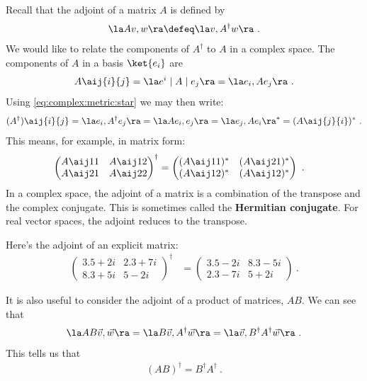 Recall that the adjoint of a matrix $A$ is defined by
\begin{align}
    \la A v , w \ra \defeq 
    \la v, A^\dag w \ra \ .
\end{align}
We would like to relate the components of $A^\dag$ to $A$ in a complex space. The components of $A$ in a basis $\ket{e_i}$ are 
\begin{align}
    A\aij{i}{j} = \la e^i \mid A \mid e_j \ra 
    = \la e_i, A e_j \ra \ .
\end{align}
Using \eqref{eq:complex:metric:star} we may then write:
\begin{align}
    (A^\dag)\aij{i}{j}
    = 
    \la e_i, A^\dag e_j \ra
    =
    \la A e_i, e_j \ra
    =
    \la e_j, A e_i \ra^*
    =
    (A\aij{j}{i})^* \ .
\end{align}
This means, for example, in matrix form:
\begin{align}
    \begin{pmatrix}
        A\aij 11 & A\aij 12 \\
        A\aij 21 & A\aij 22 
    \end{pmatrix}^\dag &= 
    \begin{pmatrix}
        (A\aij 11)^* & (A\aij 21)^* \\
        (A\aij 12)^* & (A\aij 12 )^*
    \end{pmatrix} \ .
\end{align}
In a complex space, the adjoint of a matrix is a combination of the transpose and the complex conjugate. This is sometimes called the \textbf{Hermitian conjugate}. For real vector spaces, the adjoint reduces to the transpose. 


\begin{example}
Here's the adjoint of an explicit matrix:
\begin{align}
\begin{pmatrix}
        3.5 +2i & 2.3+7i \\
        8.3 + 5i & 5-2i
    \end{pmatrix}^\dag &= 
    \begin{pmatrix}
        3.5 -2i &  8.3 - 5i\\
        2.3 -7i & 5 +2i
    \end{pmatrix} \ .
\end{align}
\end{example}

It is also useful to consider the adjoint of a product of matrices, $AB$. We can see that
\begin{align}
    \la AB \vec{v}, \vec{w} \ra
    =
    \la B \vec{v},  A^\dag \vec{w} \ra
    =
    \la \vec{v}, B^\dag A^\dag \vec{w} \ra \ .
\end{align}
This tells us that
\begin{align}
    (AB)^\dag = B^\dag A^\dag \ .
    \label{eq:adjoint:of:product}
\end{align}



